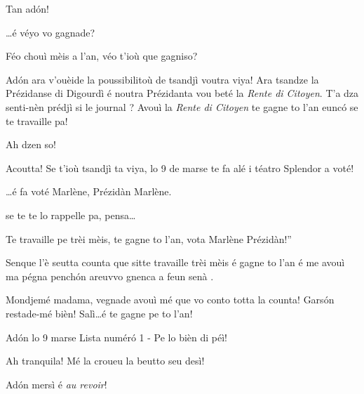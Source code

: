 \begin{drama}
\Joellespeaks Tan ad\'on!

\Dallasspeaks \ldots é véyo vo gagnade?

\Jeanspeaks Féo chouì mèis a l'an, véo t'ioù que gagniso?

\Dallasspeaks Ad\'on ara v'ouèide la poussibilitoù de tsandjì voutra viya! Ara tsandze la Prézidanse di Digourdì é noutra Prézidanta vou beté la \textit{Rente di Citoyen}. T'a dza senti-nèn prédjì si le journal \journal ? Avouì la \textit{Rente di Citoyen} te gagne to l'an eunc\'o se te travaille pa!

\Jeanspeaks Ah dzen so!

\Dallasspeaks Acoutta! Se t'ioù tsandjì ta viya, lo 9 de marse te fa alé i téatro Splendor a voté!
 
\Joellespeaks \ldots é fa voté Marlène, Prézidàn Marlène.

\Dallasspeaks {} se te te lo rappelle pa, pensa\ldots
 
\Joelledallasspeaks {} \og Te travaille pe trèi mèis, te gagne to l'an, vota Marlène Prézidàn!''



\Saventaspeaks Senque l'è seutta counta que sitte travaille trèi mèis é gagne to l’an é me avouì ma pégna pench\'on areuvvo gnenca a feun senà .

\Dallasspeaks Mondjemé madama, vegnade avouì mé que vo conto totta la counta!  Gars\'on restade-mé bièn! Salì\ldots é te gagne pe to l'an!



\Joellespeaks Ad\'on lo 9 marse Lista num\'er\'o 1 - Pe lo bièn di péì!

\Jeanspeaks Ah tranquila! Mé la croueu la beutto seu desì! 

\Joellespeaks Ad\'on mersì é \textit{au revoir}!




\end{drama}
